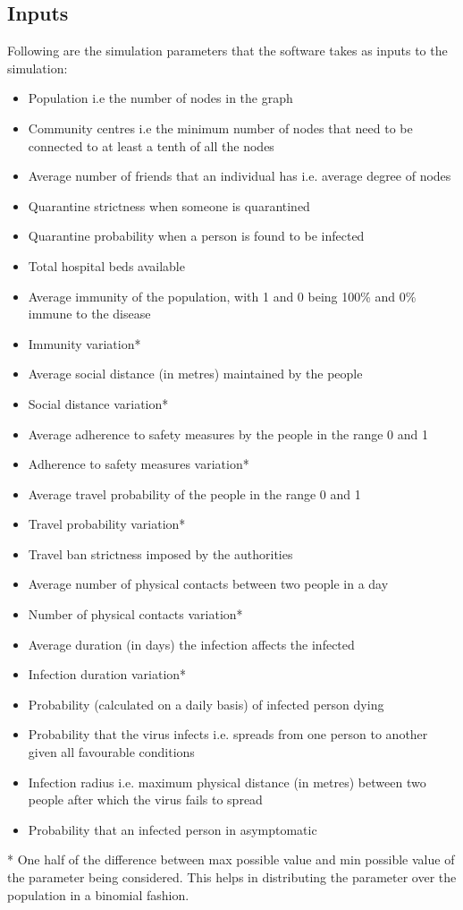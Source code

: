 \documentclass[conference]{IEEEtran}
\begin{document}
    \subsection{Inputs}
        Following are the simulation parameters that the software takes as inputs to the simulation:
        \begin{itemize}
            \item Population i.e the number of nodes in the graph
    		\item Community centres i.e the minimum number of nodes that need to be connected to at least a tenth of all the nodes
    		\item Average number of friends that an individual has i.e. average degree of nodes
    		\item Quarantine strictness when someone is quarantined
    		\item Quarantine probability when a person is found to be infected
    		\item Total hospital beds available
    		\item Average immunity of the population, with 1 and 0 being 100\% and 0\% immune to the disease
    		\item Immunity variation*
    		\item Average social distance (in metres) maintained by the people
    		\item Social distance variation*
    		\item Average adherence to safety measures by the people in the range 0 and 1
    		\item Adherence to safety measures variation*
    		\item Average travel probability of the people in the range 0 and 1
    		\item Travel probability variation*
    		\item Travel ban strictness imposed by the authorities
    		\item Average number of physical contacts between two people in a day
    		\item Number of physical contacts variation*
    		\item Average duration (in days) the infection affects the infected
    		\item Infection duration variation*
    		\item Probability (calculated on a daily basis) of infected person dying
    		\item Probability that the virus infects i.e. spreads from one person to another given all favourable conditions
    		\item Infection radius i.e. maximum physical distance (in metres) between two people after which the virus fails to spread
    		\item Probability that an infected person in asymptomatic
        \end{itemize}
        * One half of the difference between max possible value and min possible value of the parameter being considered. This helps in distributing the parameter over the population in a binomial fashion.\\
            
\end{document}
